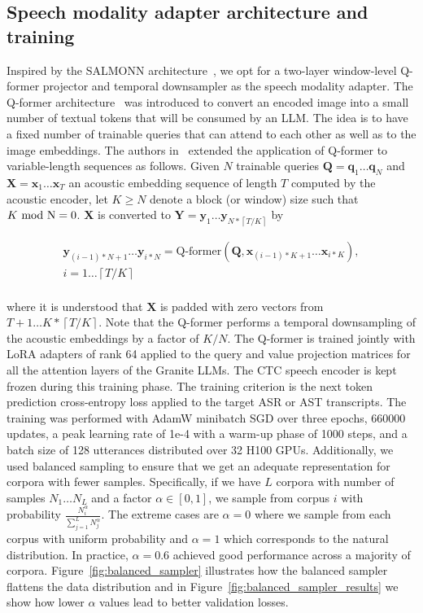 \documentclass[9pt,conference]{IEEEtran}
\begin{document}
\subsection{Speech modality adapter architecture and training}
\label{ssec:projector}
Inspired by the SALMONN architecture~\cite{tangsalmonn}, we opt for a two-layer window-level Q-former projector and temporal downsampler as the speech modality adapter. The Q-former architecture~\cite{li2023blip} was introduced to convert an encoded image into a small number of textual tokens that will be consumed by an LLM. The idea is to have a fixed number of trainable queries that can attend to each other as well as to the image embeddings. The authors in~\cite{tangsalmonn} extended the application of Q-former to variable-length sequences as follows. Given $N$ trainable queries $\mathbf{Q}=\mathbf{q}_1\ldots\mathbf{q}_N$ and $\mathbf{X}=\mathbf{x}_1\ldots\mathbf{x}_T$ an acoustic embedding sequence of length $T$ computed by the acoustic encoder, let $K\ge N$ denote a block (or window) size such that $K~\rm{mod}~N=0$. $\mathbf{X}$ is converted to $\mathbf{Y}=\mathbf{y}_1\ldots\mathbf{y}_{N*\left\lceil T/K\right\rceil}$ by

\begin{eqnarray*}
 \mathbf{y}_{(i-1)*N+1}\ldots\mathbf{y}_{i*N}=\text{Q-former}(\mathbf{Q},\mathbf{x}_{(i-1)*K+1}\ldots\mathbf{x}_{i*K}),\\
i=1\ldots \left\lceil T/K\right\rceil      
\end{eqnarray*}
~~\\
where it is understood that $\mathbf{X}$ is padded with zero vectors from $T+1\ldots K*\left\lceil T/K\right\rceil$. Note that the Q-former performs a temporal downsampling of the acoustic embeddings by a factor of $K/N$. The Q-former is trained jointly with LoRA adapters of rank 64 applied to the query and value projection matrices for all the attention layers of the Granite LLMs. The CTC speech encoder is kept frozen during this training phase. The training criterion is the next token prediction cross-entropy loss applied to the target ASR or AST transcripts. The training was performed with AdamW minibatch SGD over three epochs, 660000 updates, a peak learning rate of 1e-4 with a warm-up phase of 1000 steps, and a batch size of 128 utterances distributed over 32 H100 GPUs. Additionally, we used balanced sampling to ensure that we get an adequate representation for corpora with fewer samples. Specifically, if we have $L$ corpora with number of samples $N_1\ldots N_L$ and a factor $\alpha\in[0,1]$, we sample from corpus $i$ with probability $\frac{N_i^\alpha}{\sum_{j=1}^L N_j^\alpha}$. The extreme cases are $\alpha=0$ where we sample from each corpus with uniform probability and $\alpha=1$ which corresponds to the natural distribution. In practice, $\alpha=0.6$ achieved good performance across a majority of corpora. Figure~\ref{fig:balanced_sampler} illustrates how the balanced sampler flattens the data distribution and in Figure~\ref{fig:balanced_sampler_results} we show how lower $\alpha$ values lead to better validation losses.
\end{document}

